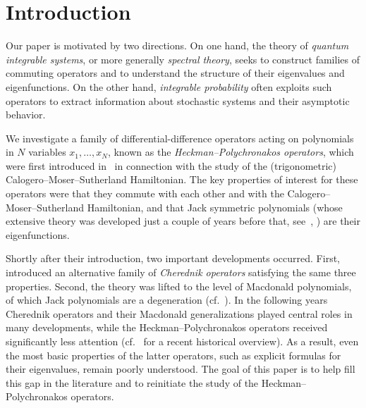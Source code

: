 \section{Introduction}

Our paper is motivated by two directions. On one hand, the theory of \emph{quantum integrable systems}, or more generally \emph{spectral theory}, seeks to construct families of commuting operators and to understand the structure of their eigenvalues and eigenfunctions. On the other hand, \emph{integrable probability} often exploits such operators to extract information about stochastic systems and their asymptotic behavior.

We investigate a family of differential-difference operators acting on polynomials in $N$ variables $x_1,\dots,x_N$, known as the \emph{Heckman--Polychronakos operators}, which were first introduced in~\cite{heckman1991elementary,polychronakos1992exchange} in connection with the study of the (trigonometric) Calogero--Moser--Sutherland Hamiltonian. The key properties of interest for these operators were that they commute with each other and with the Calogero--Moser--Sutherland Hamiltonian, and that Jack symmetric polynomials (whose extensive theory was developed just a couple of years before that, see~\cite{stanley1989some}, \cite[Chapter VI]{macdonald1998symmetric}) are their eigenfunctions.


Shortly after their introduction, two important developments occurred. First,~\cite{cherednik1991unification,cherednik1994integration} introduced an alternative family of \emph{Cherednik operators} satisfying the same three properties. Second, the theory was lifted to the level of Macdonald polynomials, of which Jack polynomials are a degeneration (cf.\ \cite[Chapter 6]{macdonald1998symmetric}). In the following years Cherednik operators and their Macdonald generalizations played central roles in many developments, while the Heckman--Polychronakos operators received significantly less attention (cf.~\cite{chalykh2024dunkl} for a recent historical overview). As a result, even the most basic properties of the latter operators, such as explicit formulas for their eigenvalues, remain poorly understood. The goal of this paper is to help fill this gap in the literature and to reinitiate the study of the Heckman--Polychronakos operators.


